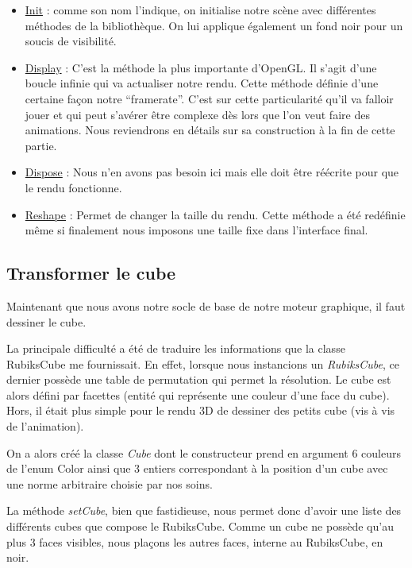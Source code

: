 \begin{itemize}
    \item \underline{Init} : comme son nom l’indique, on initialise notre scène avec différentes méthodes de la bibliothèque. On lui applique également un fond noir pour un soucis de visibilité.

    \item \underline{Display} : C’est la méthode la plus importante d’OpenGL. Il s’agit d’une boucle infinie qui va actualiser notre rendu. Cette méthode définie d’une certaine façon notre “framerate”.
C’est sur cette particularité qu’il va falloir jouer et qui peut s’avérer être complexe dès lors que l’on veut faire des animations. Nous reviendrons en détails sur sa construction à la fin de cette partie.

\item \underline{Dispose}  : Nous n’en avons pas besoin ici mais elle doit être réécrite pour que le rendu fonctionne.

\item \underline{Reshape} : Permet de changer la taille du rendu. Cette méthode a été redéfinie même si finalement nous imposons une taille fixe dans l’interface final.

\end{itemize}

\subsection{Transformer le cube}
Maintenant que nous avons notre socle de base de notre moteur graphique, il faut dessiner le cube.

La principale difficulté a été de traduire les informations que la classe RubiksCube me fournissait. En effet, lorsque nous instancions un \textit{RubiksCube}, ce dernier possède une table de permutation qui permet la résolution. Le cube est alors défini par facettes (entité qui représente une couleur d’une face du cube). Hors, il était plus simple pour le rendu 3D de dessiner des petits cube (vis à vis de l’animation).

On a alors créé la classe \textit{Cube} dont le constructeur prend en argument 6 couleurs de l’enum Color ainsi que 3 entiers correspondant à la position d’un cube avec une norme arbitraire choisie par nos soins.

La méthode \textit{setCube}, bien que fastidieuse, nous permet donc d’avoir une liste des différents cubes que compose le RubiksCube. Comme un cube ne possède qu’au plus 3 faces visibles, nous plaçons les autres faces, interne au RubiksCube, en noir.

